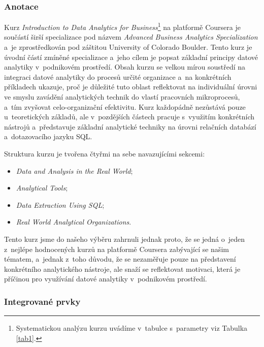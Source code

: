\hypertarget{anotace}{%
\subsubsection{Anotace}\label{anotace}}

Kurz \emph{Introduction to Data Analytics for Business}\footnote{Systematickou analýzu kurzu uvádíme v~tabulce s~parametry viz Tabulka \ref{tab1}.} na platformě Coursera je součástí širší specializace pod názvem \emph{Advanced Business Analytics Specialization} a~je zprostředkován pod záštitou University of Colorado Boulder. Tento kurz je úvodní částí zmíněné specializace a~jeho cílem je popsat základní principy datové analytiky v~podnikovém prostředí. Obsah kurzu se velkou mírou soustředí na integraci datové analytiky do procesů určité organizace a~na konkrétních příkladech ukazuje, proč je důležité tuto oblast reflektovat na individuální úrovni ve smyslu zavádění analytických technik do vlastí pracovních mikroprocesů, a~tím zvyšovat celo-organizační efektivitu. Kurz každopádně nezůstává pouze u~teoretických základů, ale v~pozdějších částech pracuje s~využitím konkrétních nástrojů a~představuje základní analytické techniky na úrovni relačních databází a~dotazovacího jazyku SQL.~\parencite{course1}

Struktura kurzu je tvořena čtyřmi na sebe navazujícími sekcemi:

\begin{itemize}
\tightlist
\item
  \emph{Data and Analysis in the Real World};
\item
  \emph{Analytical Tools};
\item
  \emph{Data Extraction Using SQL};
\item
  \emph{Real World Analytical Organizations}.
\end{itemize}

Tento kurz jsme do našeho výběru zahrnuli jednak proto, že se jedná o~jeden z~nejlépe hodnocených kurzů na platformě Coursera zabývající se našim tématem, a~jednak z~toho důvodu, že se nezaměřuje pouze na představení konkrétního analytického nástroje, ale snaží se reflektovat motivaci, která je příčinou pro využívání datové analytiky v~podnikovém prostředí.

\hypertarget{integrovanuxe9-prvky}{%
\subsubsection{Integrované prvky}\label{integrovanuxe9-prvky}}

